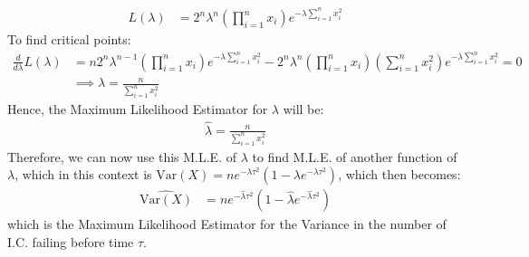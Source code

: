 \documentclass[a4paper]{article}
\begin{document}
\begin{equation*}
	\begin{split}
		L\left( \lambda \right) &= 2^{n}\lambda^{n} \left(\prod_{i=1}^{n}  x_i\right) e^{-\lambda \sum_{i=1}^{n} x_i^2 
}	\end{split}
\end{equation*}
To find critical points:
\begin{equation*}
	\begin{split}
	\frac{d}{d\lambda} L\left( \lambda \right) &= n	2^{n} \lambda^{n-1} \left( \prod_{i=1}^{n} x_i \right) e^{-\lambda \sum_{i=1}^{n} x_{i}^2} -  2^{n}\lambda^{n}\left( \prod_{i=1}^{n} x_{i}  \right) \left( \sum_{i=1}^{n} x_{i}^2\right) e^{-\lambda \sum_{i=1}^{n} x_{i}^2} = 0\\
	&\implies \lambda = \frac{n}{\sum_{i=1}^{n} x_{i}^2}
	\end{split}
\end{equation*}
Hence, the Maximum Likelihood Estimator for $\lambda$ will be:
 \begin{equation*}
	\begin{split}
		\hat{\lambda} = \frac{n}{\sum_{i=1}^{n} x_{i}^2}
	\end{split}
\end{equation*}
Therefore, we can now use this M.L.E. of $\lambda$ to find M.L.E. of another function of $\lambda$, which in this context is  $\text{Var}\left( X \right) = ne^{-\lambda \tau^2}\left( 1- \lambda e^{-\lambda\tau^2} \right) $, which then becomes:
\begin{equation*}
	\begin{split}
		\hat{\text{Var}\left( X \right) } &= ne^{-\hat{\lambda}\tau^2} \left( 1 - \hat{\lambda}  e^{-\hat{\lambda}\tau^2}\right) 
	\end{split}
\end{equation*}
which is the Maximum Likelihood Estimator for the Variance in the number of I.C. failing before time $\tau $.
 
\end{document}
